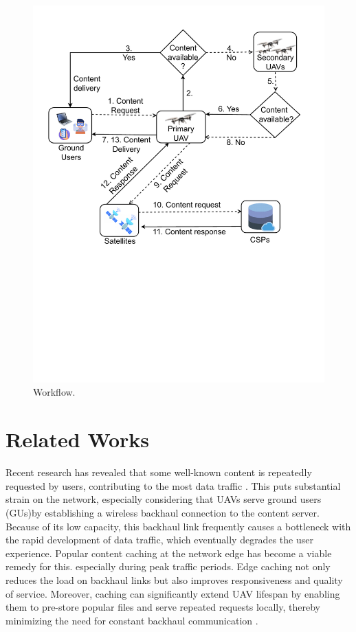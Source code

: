 \documentclass[journal]{IEEEtran}
\begin{document}
\begin{figure}[h]
\begin{minipage}{0.45\textwidth}
        \includegraphics[width=\textwidth,trim=0.6cm 8.4cm 0.6cm 1.8cm, clip]{Diagrams/Flowchart.drawio (1).pdf}
        \caption{Workflow.}
        \label{fig:workflow}
    \end{minipage}
\end{figure}
\section{Related Works}
Recent research has revealed that some well-known content is repeatedly requested by users, contributing to the most data traffic \cite{749260}. This puts substantial strain on the network, especially considering that UAVs serve ground users (GUs)by establishing a wireless backhaul connection to the content server. Because of its low capacity, this backhaul link frequently causes a bottleneck with the rapid development of data traffic, which eventually degrades the user experience. Popular content caching at the network edge has become a viable remedy for this. especially during peak traffic periods. Edge caching not only reduces the load on backhaul links but also improves responsiveness and quality of service. Moreover, caching can significantly extend UAV lifespan by enabling them to pre-store popular files and serve repeated requests locally, thereby minimizing the need for constant backhaul communication \cite{8982038, nguyen2023real, yang2023caching}.
\end{document}
